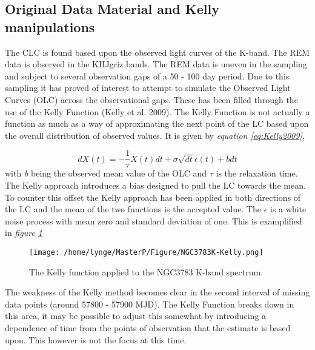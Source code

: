\documentclass[twocolumn]{article}
\begin{document}
\subsection{Original Data Material and Kelly manipulations}
The CLC is found based upon the observed light curves of the K-band. The REM data is observed in the KHJgriz bands. The REM data is uneven in the sampling and subject to several observation gaps of a 50 - 100 day period. Due to this sampling it has proved of interest to attempt to simulate the Observed Light Curves (OLC) across the observational gaps. These has been filled through the use of the Kelly Function (Kelly et al. 2009). The Kelly Function is not actually a function as much as a way of approximating the next point of the LC based upon the overall distribution of observed values. It is given by \emph{equation \ref{eq:Kelly2009}},

\begin{equation}
dX(t) = -\frac{1}{\tau}X(t)dt + \sigma\sqrt{dt}\epsilon(t) + bdt
\label{eq:Kelly2009}
\end{equation}
with \emph{b} being the observed mean value of the OLC and $\tau$ is the relaxation time. The Kelly approach introduces a bias designed to pull the LC towards the mean. To counter this offset the Kelly approach has been applied in both directions of the LC and the mean of the two functions is the accepted value. The $\epsilon$ is a white noise process with mean zero and standard deviation of one. This is examplified in \emph{figure \ref{fig:NGC3783K-Kelly}}

\begin{figure}[htp!]
\centering
\texttt{[image: /home/lynge/MasterP/Figure/NGC3783K-Kelly.png]}\\
\caption{The Kelly function applied to the NGC3783 K-band spectrum.}
\label{fig:NGC3783K-Kelly}
\end{figure}

The weakness of the Kelly method becomes clear in the second interval of missing data points (around 57800 - 57900 MJD). The Kelly Function breaks down in this area, it may be possible to adjust this somewhat by introducing a dependence of time from the points of observation that the estimate is based upon. This however is not the focus at this time. \\
\\
\end{document}
